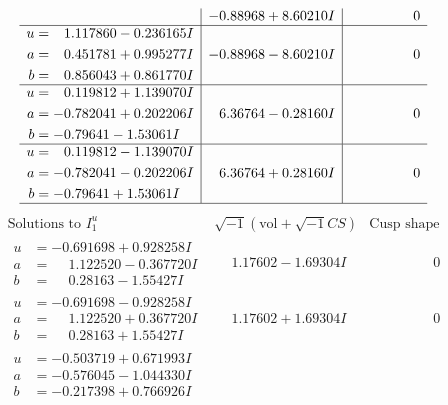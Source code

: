 \documentclass[1p]{elsarticle_modified}
\theoremstyle{definition}
\newcommand{\I}{\sqrt{-1}}
\begin{document}
$$\begin{array}{c|c|c}
 & -0.88968 + 8.60210 I & \phantom{-0.000000 } 0 \\ \hline\begin{aligned}
u &= \phantom{-}1.117860 - 0.236165 I \\
a &= \phantom{-}0.451781 + 0.995277 I \\
b &= \phantom{-}0.856043 + 0.861770 I\end{aligned}
 & -0.88968 - 8.60210 I & \phantom{-0.000000 } 0 \\ \hline\begin{aligned}
u &= \phantom{-}0.119812 + 1.139070 I \\
a &= -0.782041 + 0.202206 I \\
b &= -0.79641 - 1.53061 I\end{aligned}
 & \phantom{-}6.36764 - 0.28160 I & \phantom{-0.000000 } 0 \\ \hline\begin{aligned}
u &= \phantom{-}0.119812 - 1.139070 I \\
a &= -0.782041 - 0.202206 I \\
b &= -0.79641 + 1.53061 I\end{aligned}
 & \phantom{-}6.36764 + 0.28160 I & \phantom{-0.000000 } 0\\
 \hline 
 \end{array}$$\newpage$$\begin{array}{c|c|c}  
\text{Solutions to }I^u_{1}& \I (\text{vol} + \sqrt{-1}CS) & \text{Cusp shape}\\
 \hline 
\begin{aligned}
u &= -0.691698 + 0.928258 I \\
a &= \phantom{-}1.122520 - 0.367720 I \\
b &= \phantom{-}0.28163 - 1.55427 I\end{aligned}
 & \phantom{-}1.17602 - 1.69304 I & \phantom{-0.000000 } 0 \\ \hline\begin{aligned}
u &= -0.691698 - 0.928258 I \\
a &= \phantom{-}1.122520 + 0.367720 I \\
b &= \phantom{-}0.28163 + 1.55427 I\end{aligned}
 & \phantom{-}1.17602 + 1.69304 I & \phantom{-0.000000 } 0 \\ \hline\begin{aligned}
u &= -0.503719 + 0.671993 I \\
a &= -0.576045 - 1.044330 I \\
b &= -0.217398 + 0.766926 I\end{aligned}

\end{array}$$
\end{document}
